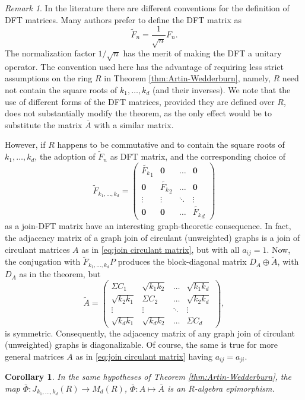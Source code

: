 \documentclass[12pt, a4paper]{amsart}
\numberwithin{equation}{section} %
\theoremstyle{plain}
\theoremstyle{definition}
\theoremstyle{plain}
\newtheorem{cor}[thm]{Corollary}
\theoremstyle{remark}
\newtheorem{rem}[thm]{Remark}
\begin{document}
\begin{rem}
In the literature there are different conventions for the definition of DFT matrices. Many authors prefer to define the DFT matrix as 
\[\widetilde{F}_n=\frac{1}{\sqrt{n}}F_n.\]
The normalization factor $1/\sqrt{n}$ has the merit of making the DFT a unitary operator. The convention used here has the advantage of requiring less strict assumptions on the ring $R$ in Theorem \ref{thm:Artin-Wedderburn}, namely, $R$ need not contain the square roots of $k_1,\dots,k_d$ (and their inverses). We note that the use of different forms of the DFT matrices, provided they are defined over $R$, does not substantially modify the theorem, as the only effect would be to substitute the matrix $\overline{A}$ with a similar matrix.

However, if $R$ happens to be commutative and to contain the square roots of $k_1,\dots,k_d$, the adoption of $\widetilde{F}_n$ as DFT matrix, and the corresponding choice of
\[
\widetilde{F}_{k_1,\dots,k_d}=\left(\begin{array}{c|c|c|c}
\widetilde{F_{k}}_1 & \mathbf{0} & \dots & \mathbf{0}\\
\hline
\mathbf{0} & \widetilde{F_{k}}_2 & \dots & \mathbf{0}\\
\hline
\vdots & \vdots & \ddots & \vdots\\
\hline
\mathbf{0} & \mathbf{0} & \dots & \widetilde{F_{k}}_d
\end{array}
\right)
\]
as a join-DFT matrix have an interesting graph-theoretic consequence. In fact, the adjacency matrix of a graph join of circulant (unweighted) graphs is a join of circulant matrices $A$ as in \eqref{eq:join circulant matrix}, but with all $a_{ij}=1$. Now, the conjugation with $\widetilde{F}_{k_1,\dots,k_d}P$ produces the block-diagonal matrix $D_A\oplus \widetilde{A}$, with $D_A$ as in the theorem, but
\[
\widetilde{A}=\begin{pmatrix}
\Sigma C_1 & \sqrt{k_1k_2} & \dots & \sqrt{k_1k_d}\\
\sqrt{k_2k_1} & \Sigma C_2 & \dots & \sqrt{k_2k_d}\\
\vdots & \vdots & \ddots & \vdots\\
\sqrt{k_dk_1} & \sqrt{k_dk_2} & \dots & \Sigma C_d
\end{pmatrix},
\]
 is symmetric. Consequently, the adjacency matrix of any graph join of circulant (unweighted) graphs is diagonalizable. Of course, the same is true for more general matrices $A$ as in \eqref{eq:join circulant matrix} having $a_{ij}=a_{ji}$.
\end{rem}

\begin{cor}
In the same hypotheses of Theorem \ref{thm:Artin-Wedderburn}, the map $\overline{\Phi}:J_{k_1,\dots,k_d}(R)\to M_d(R)$, $\overline{\Phi}:A\mapsto\overline{A}$ is an $R$-algebra epimorphism.
\end{cor}



\end{document}
